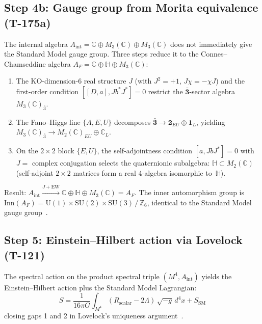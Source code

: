 \subsection{Step 4b: Gauge group from Morita equivalence (T-175a)}

The internal algebra $A_{\mathrm{int}} = \mathbb{C} \oplus M_3(\mathbb{C}) \oplus
M_3(\mathbb{C})$ does not immediately give the Standard Model gauge group.
Three steps reduce it to the Connes--Chamseddine algebra
$A_F = \mathbb{C} \oplus \mathbb{H} \oplus M_3(\mathbb{C})$:

\begin{enumerate}[leftmargin=2em,nosep]
  \item The KO-dimension-6 real structure $J$ (with $J^2 = +1$, $J\chi = -\chi J$)
        and the first-order condition $[[D,a],Jb^*J^*] = 0$ restrict the
        $\bar{\mathbf{3}}$-sector algebra $M_3(\mathbb{C})_{\bar{3}}$.
  \item The Fano--Higgs line $\{A,E,U\}$ decomposes
        $\bar{\mathbf{3}} \to \mathbf{2}_{EU} \oplus \mathbf{1}_L$, yielding
        $M_3(\mathbb{C})_{\bar{3}} \to M_2(\mathbb{C})_{EU} \oplus \mathbb{C}_L$.
  \item On the $2 \times 2$ block $\{E,U\}$, the self-adjointness condition
        $[a, JbJ^*] = 0$ with $J = $ complex conjugation selects the quaternionic
        subalgebra: $\mathbb{H} \subset M_2(\mathbb{C})$ (self-adjoint $2 \times 2$
        matrices form a real 4-algebra isomorphic to~$\mathbb{H}$).
\end{enumerate}

\noindent
Result: $A_{\mathrm{int}} \xrightarrow{J + \mathrm{EW}}
\mathbb{C} \oplus \mathbb{H} \oplus M_3(\mathbb{C}) = A_F$.
The inner automorphism group is
$\mathrm{Inn}(A_F) = \mathrm{U}(1) \times \mathrm{SU}(2) \times
\mathrm{SU}(3)\,/\,\mathbb{Z}_6$, identical to the Standard Model gauge
group~\cite{connes1996,chamseddine2007}.

\subsection{Step 5: Einstein--Hilbert action via Lovelock (T-121)}

\begin{theorembox}
The spectral action on the product spectral triple
$(M^4, A_{\mathrm{int}})$ yields the Einstein--Hilbert action plus the Standard Model
Lagrangian:
\begin{equation}
  S = \frac{1}{16\pi G}\int_{M^4} (R_{\mathrm{scalar}} - 2\Lambda)\,\sqrt{-g}\,d^4x
  + S_{\mathrm{SM}}
  \label{eq:einstein-hilbert}
\end{equation}
closing gaps 1 and 2 in Lovelock's uniqueness argument~\cite{lovelock1971}.
\end{theorembox}

